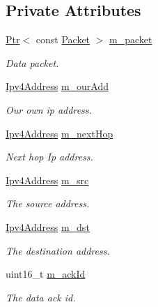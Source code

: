 \subsection*{Private Attributes}
\begin{DoxyCompactItemize}
\item 
\hyperlink{classns3_1_1Ptr}{Ptr}$<$ const \hyperlink{classns3_1_1Packet}{Packet} $>$ \hyperlink{classns3_1_1dsr_1_1DsrMaintainBuffEntry_a6a72e5b4510c86ad7386a9fa19f16eee}{m\+\_\+packet}
\begin{DoxyCompactList}\small\item\em Data packet. \end{DoxyCompactList}\item 
\hyperlink{classns3_1_1Ipv4Address}{Ipv4\+Address} \hyperlink{classns3_1_1dsr_1_1DsrMaintainBuffEntry_a6a7a521689ba0c72e1765e61a5069939}{m\+\_\+our\+Add}
\begin{DoxyCompactList}\small\item\em Our own ip address. \end{DoxyCompactList}\item 
\hyperlink{classns3_1_1Ipv4Address}{Ipv4\+Address} \hyperlink{classns3_1_1dsr_1_1DsrMaintainBuffEntry_a2656ab85f3118009265566aa52a5d116}{m\+\_\+next\+Hop}
\begin{DoxyCompactList}\small\item\em Next hop Ip address. \end{DoxyCompactList}\item 
\hyperlink{classns3_1_1Ipv4Address}{Ipv4\+Address} \hyperlink{classns3_1_1dsr_1_1DsrMaintainBuffEntry_ad3ffaac5b36e8a3b2ac15a47339b975f}{m\+\_\+src}
\begin{DoxyCompactList}\small\item\em The source address. \end{DoxyCompactList}\item 
\hyperlink{classns3_1_1Ipv4Address}{Ipv4\+Address} \hyperlink{classns3_1_1dsr_1_1DsrMaintainBuffEntry_a4f0acb4e51f41c44716533da3e1539ee}{m\+\_\+dst}
\begin{DoxyCompactList}\small\item\em The destination address. \end{DoxyCompactList}\item 
uint16\+\_\+t \hyperlink{classns3_1_1dsr_1_1DsrMaintainBuffEntry_a84f82b5513baef85ec068e9863f646e7}{m\+\_\+ack\+Id}
\begin{DoxyCompactList}\small\item\em The data ack id. \end{DoxyCompactList}\item 

\end{DoxyCompactItemize}

